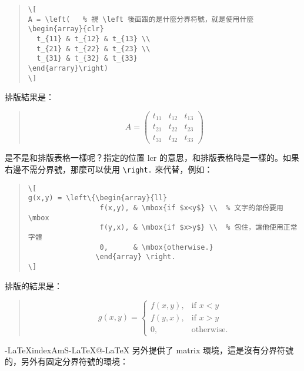 \begin{quote}
  \begin{verbatim}
\[
A = \left(   % 視 \left 後面跟的是什麼分界符號，就是使用什麼
\begin{array}{clr}
  t_{11} & t_{12} & t_{13} \\
  t_{21} & t_{22} & t_{23} \\
  t_{31} & t_{32} & t_{33}
\end{arrary}\right)
\]
\end{verbatim}
\end{quote}

排版結果是：
\begin{quote}
  \[ A = \left(
    \begin{array}{clr}
        t_{11} & t_{12} & t_{13} \\
        t_{21} & t_{22} & t_{23} \\
        t_{31} & t_{32} & t_{33}
      \end{array}\right) \]
\end{quote}
是不是和排版表格一樣呢？指定的位置 {\ttfamily lcr} 的意思，和排版表格時是一樣的。如果右邊不需分界號，那麼可以使用 \verb|\right.| 來代替，例如：

\begin{quote}
  \begin{verbatim}
\[
g(x,y) = \left\{\begin{array}{ll}
                 f(x,y), & \mbox{if $x<y$} \\  % 文字的部份要用 \mbox
                 f(y,x), & \mbox{if $x>y$} \\  % 包住，讓他使用正常字體
                 0,      & \mbox{otherwise.}
                \end{array} \right.
\]
\end{verbatim}
\end{quote}

排版的結果是：
\begin{quote}
  \[
    g(x,y) = \left\{\begin{array}{ll}
      f(x,y), & \mbox{if $x<y$}   \\
      f(y,x), & \mbox{if $x>y$}   \\
      0,      & \mbox{otherwise.}
    \end{array} \right.
  \]
\end{quote}

\AmS-\LaTeX{}index{AmS-LaTeX@\AmS-\LaTeX} 另外提供了 {\ttfamily matrix} 環境，這是沒有分界符號的，另外有固定分界符號的環境：

